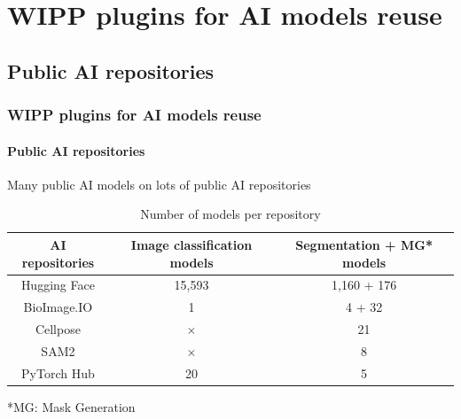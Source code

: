 \def\sectiontitle{WIPP plugins for AI models reuse}

\section{\sectiontitle}

\def\slidetitle{Public AI repositories}

\subsection{\slidetitle}
\begin{frame}
  \frametitle{\sectiontitle}
  \framesubtitle{\slidetitle}

  Many public AI models on lots of public AI repositories

  \begin{center}
    \begin{table}
      \begin{tabular}{|c|c|c|}
       \hline
       \rowcolor{tableFirstRowColor} AI repositories & Image classification models & Segmentation + MG* models \\ [0.5ex]
       \hline
       \cellcolor{tableFirstColColor} Hugging Face & 15,593 & 1,160 + 176 \\
       \hline
       \cellcolor{tableFirstColColor} BioImage.IO & 1 & 4 + 32 \\
       \hline
       \cellcolor{tableFirstColColor} Cellpose & $\times$ & 21 \\
       \hline
       \cellcolor{tableFirstColColor} SAM2 & $\times$ & 8 \\
       \hline
       \cellcolor{tableFirstColColor} PyTorch Hub & 20 & 5 \\
       \hline
      \end{tabular}
      \caption{Number of models per repository}
    \end{table}
  \end{center}

  *MG: Mask Generation

\end{frame}

\def\slidetitle{Unlock these repositories}

